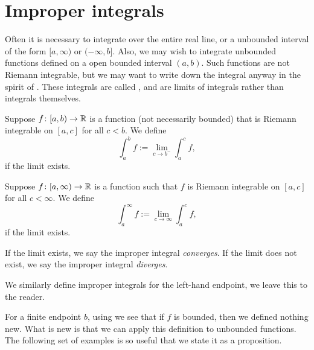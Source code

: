 
\sectionnewpage
\section{Improper integrals}
\label{sec:impropriemann}


Often it is necessary to integrate over the
entire real line, or a unbounded interval of the form $[a,\infty)$ or
$(-\infty,b]$.  Also, we may wish to integrate unbounded functions
defined on a open bounded interval $(a,b)$.
Such functions are not Riemann integrable, but we may want to write down
the integral anyway in the spirit of .
These integrals are called \emph{},
and are limits
of integrals rather than integrals themselves.

\begin{defn}
Suppose $f \colon [a,b) \to {\mathbb{R}}$ is a function (not necessarily bounded)
that is Riemann integrable on $[a,c]$ for all $c < b$.  We define
\begin{equation*}
\int_a^b f := \lim_{c \to b^-} \int_a^{c} f ,
\end{equation*}
if the limit exists.

Suppose $f \colon [a,\infty) \to {\mathbb{R}}$ is a function such that
$f$ is Riemann integrable on $[a,c]$ for all $c < \infty$.  
We define
\begin{equation*}
\int_a^\infty f := \lim_{c \to \infty} \int_a^c f ,
\end{equation*}
if the limit exists.

If the limit exists, we say the improper integral
\emph{converges}.
If the limit does not exist, we say the improper integral
\emph{diverges}.

We similarly define improper integrals for the left-hand endpoint, we leave
this to the reader.
\end{defn}

For a finite endpoint $b$,
using  we see that if
$f$ is bounded, then we defined nothing new.  What is new is that
we can apply this definition to unbounded functions.
The following set of examples is
so useful that we state it as a proposition.

